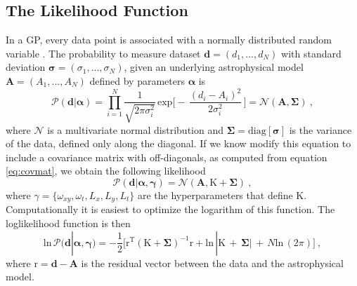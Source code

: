 \documentclass[twocolumn]{aastex61}
\begin{document}
\subsection{The Likelihood Function}
\label{sec:lnp}
In a GP, every data point is associated with a normally distributed random variable \citep{rasmussen2006}. The probability to measure dataset $\boldsymbol{d} = (d_{1},...,d_{N})$ with standard deviation $\boldsymbol{\sigma} = (\sigma_{1},...,\sigma_{N})$, given an underlying astrophysical model $\boldsymbol{A} = (A_{1},...,A_{N})$ defined by parameters $\boldsymbol{\alpha}$ is
\begin{equation}
  \mathcal{P}(\boldsymbol{d}|\boldsymbol{\alpha}) =
   \prod_{i=1}^{N}\frac{1}{\sqrt{2\pi\sigma_{i}^{2}}}\, \mathrm{exp}\bigg[ - \, \frac{(d_{i} - A_{i})^{2}}{2\sigma_{i}^{2}}\, \bigg] = \mathcal{N}(\boldsymbol{A},\boldsymbol{\Sigma})\ ,
\label{eq:firstP}
\end{equation}
where $\mathcal{N}$ is a multivariate normal distribution and $\boldsymbol{\Sigma} = \mathrm{diag}[\boldsymbol{\sigma}]$ is the variance of the data, defined only along the diagonal. If we know modify this equation to include a covariance matrix with off-diagonals, as computed from equation \ref{eq:covmat}, we obtain the following likelihood
\begin{equation}
  \mathcal{P}(\boldsymbol{d}|\boldsymbol{\alpha},\boldsymbol{\gamma}) =  \mathcal{N}(\boldsymbol{A},\boldsymbol{\mathrm{K}}+\boldsymbol{\Sigma})\ ,
  \label{eq:P of KSig}
\end{equation}
where $\gamma = \{\omega_{xy},\omega_{t},L_{x},L_{y},L_{t}\}$ are the hyperparameters that define $\boldsymbol{\mathrm{K}}$. Computationally it is easiest to optimize the logarithm of this function. The loglikelihood function is then
\begin{equation}
  \mathrm{ln}\, \mathcal{P}(\boldsymbol{d}|\boldsymbol{\alpha},\boldsymbol{\gamma}) = -\frac{1}{2}\bigg[\boldsymbol{\mathrm{r}}^{\mathrm{T}}(\boldsymbol{\mathrm{K}} + \boldsymbol{\Sigma})^{-1}\boldsymbol{\mathrm{r}} + \mathrm{ln}\,|\boldsymbol{\mathrm{K}} \,+ \,\boldsymbol{\Sigma}| \,+\, N \mathrm{ln} \, (2\pi)\bigg]\ ,
  \label{eq:loglikeli}
\end{equation}
where $\boldsymbol{\mathrm{r}} = \boldsymbol{d} - \boldsymbol{A}$ is the residual vector between the data and the astrophysical model.
\end{document}
